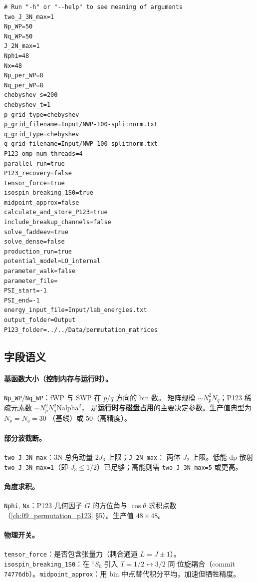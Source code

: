 \begin{lstlisting}[style=config, caption={\texttt{CPP/Input/input.txt} 默认
模板（origin 35 行）。},
                   label={lst:ch18-input}]
# Run "-h" or "--help" to see meaning of arguments
two_J_3N_max=1
Np_WP=50
Nq_WP=50
J_2N_max=1
Nphi=48
Nx=48
Np_per_WP=8
Nq_per_WP=8
chebyshev_s=200
chebyshev_t=1
p_grid_type=chebyshev
p_grid_filename=Input/NWP-100-splitnorm.txt
q_grid_type=chebyshev
q_grid_filename=Input/NWP-100-splitnorm.txt
P123_omp_num_threads=4
parallel_run=true
P123_recovery=false
tensor_force=true
isospin_breaking_1S0=true
midpoint_approx=false
calculate_and_store_P123=true
include_breakup_channels=false
solve_faddeev=true
solve_dense=false
production_run=true
potential_model=LO_internal
parameter_walk=false
parameter_file=
PSI_start=-1
PSI_end=-1
energy_input_file=Input/lab_energies.txt
output_folder=Output
P123_folder=../../Data/permutation_matrices
\end{lstlisting}

\subsection{字段语义}

\paragraph{基函数大小（控制内存与运行时）。}
\texttt{Np\_WP}/\texttt{Nq\_WP}：fWP 与 SWP 在 $p$/$q$ 方向的 bin 数。
矩阵规模 $\sim N_p^2 N_q$；P123 稀疏元素数 $\sim N_p^2 N_q^2 \mathrm{Nalpha}^2$，
是\textbf{运行时与磁盘占用}的主要决定参数。生产值典型为 $N_p = N_q = 30$
（基线）或 $50$（高精度）。

\paragraph{部分波截断。}
\texttt{two\_J\_3N\_max}：3N 总角动量 $2J_3$ 上限；\texttt{J\_2N\_max}：
两体 $J_2$ 上限。低能 dp 散射 \texttt{two\_J\_3N\_max=1}（即
$J_3 \le 1/2$）已足够；高能则需 \texttt{two\_J\_3N\_max=5} 或更高。

\paragraph{角度求积。}
\texttt{Nphi}, \texttt{Nx}：P123 几何因子 $\tilde G$ 的方位角与
$\cos\theta$ 求积点数（\cref{ch:09_permutation_p123} §5）。生产值
$48 \times 48$。

\paragraph{物理开关。}
\texttt{tensor\_force}：是否包含张量力（耦合通道 $L = J \pm 1$）。
\texttt{isospin\_breaking\_1S0}：在 $^1S_0$ 引入 $T = 1/2 \leftrightarrow 3/2$ 同
位旋耦合（commit \texttt{74776db}）。\texttt{midpoint\_approx}：用 bin
中点替代积分平均，加速但牺牲精度。


